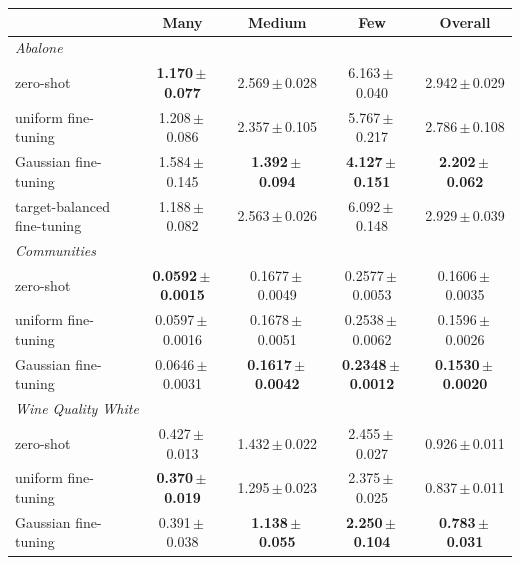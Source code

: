 \begin{tabular}{lcccc}
\toprule
& Many & Medium & Few & Overall \\
\midrule
\multicolumn{5}{l}{\textit{Abalone}} \\
zero-shot & \textbf{1.170\,$\pm$\,0.077} & 2.569\,$\pm$\,0.028 & 6.163\,$\pm$\,0.040 & 2.942\,$\pm$\,0.029 \\
uniform fine-tuning & 1.208\,$\pm$\,0.086 & 2.357\,$\pm$\,0.105 & 5.767\,$\pm$\,0.217 & 2.786\,$\pm$\,0.108 \\
Gaussian fine-tuning & 1.584\,$\pm$\,0.145 & \textbf{1.392\,$\pm$\,0.094} & \textbf{4.127\,$\pm$\,0.151} & \textbf{2.202\,$\pm$\,0.062} \\
target-balanced fine-tuning & 1.188\,$\pm$\,0.082 & 2.563\,$\pm$\,0.026 & 6.092\,$\pm$\,0.148 & 2.929\,$\pm$\,0.039 \\
\midrule
\multicolumn{5}{l}{\textit{Communities}} \\
zero-shot & \textbf{0.0592\,$\pm$\,0.0015} & 0.1677\,$\pm$\,0.0049 & 0.2577\,$\pm$\,0.0053 & 0.1606\,$\pm$\,0.0035 \\
uniform fine-tuning & 0.0597\,$\pm$\,0.0016 & 0.1678\,$\pm$\,0.0051 & 0.2538\,$\pm$\,0.0062 & 0.1596\,$\pm$\,0.0026 \\
Gaussian fine-tuning & 0.0646\,$\pm$\,0.0031 & \textbf{0.1617\,$\pm$\,0.0042} & \textbf{0.2348\,$\pm$\,0.0012} & \textbf{0.1530\,$\pm$\,0.0020} \\
\midrule
\multicolumn{5}{l}{\textit{Wine Quality White}} \\
zero-shot & 0.427\,$\pm$\,0.013 & 1.432\,$\pm$\,0.022 & 2.455\,$\pm$\,0.027 & 0.926\,$\pm$\,0.011 \\
uniform fine-tuning & \textbf{0.370\,$\pm$\,0.019} & 1.295\,$\pm$\,0.023 & 2.375\,$\pm$\,0.025 & 0.837\,$\pm$\,0.011 \\
Gaussian fine-tuning & 0.391\,$\pm$\,0.038 & \textbf{1.138\,$\pm$\,0.055} & \textbf{2.250\,$\pm$\,0.104} & \textbf{0.783\,$\pm$\,0.031} \\
\bottomrule
\end{tabular}
